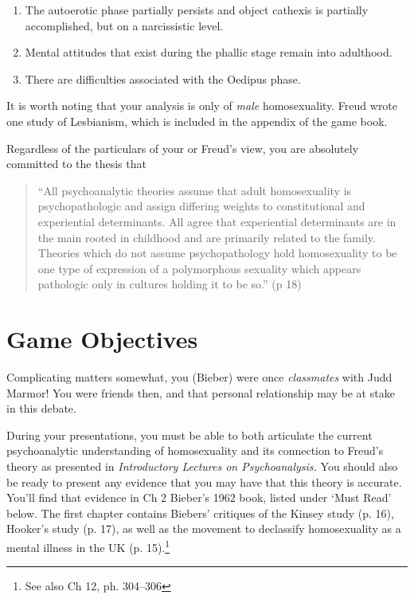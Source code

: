 \begin{refsection}
\begin{enumerate}
\item The autoerotic phase partially persists and object cathexis is partially accomplished, but on a narcissistic level.

\item Mental attitudes that exist during the phallic stage remain into adulthood.

\item There are difficulties associated with the Oedipus phase.

\end{enumerate}

It is worth noting that your analysis is only of \emph{male} homosexuality. Freud wrote one study of Lesbianism, which is included in the appendix of the game book.

Regardless of the particulars of your or Freud's view, you are absolutely committed to the thesis that

\begin{quote}

“All psychoanalytic theories assume that adult homosexuality is psychopathologic and assign differing weights to constitutional and experiential determinants. All agree that experiential determinants are in the main rooted in childhood and are primarily related to the family. Theories which do not assume psychopathology hold homosexuality to be one type of expression of a polymorphous sexuality which appears pathologic only in cultures holding it to be so.” (p 18)
\end{quote}

\section{Game Objectives}
\label{gameobjectives}

Complicating matters somewhat, you (Bieber) were once \emph{classmates} with Judd Marmor! You were friends then, and that personal relationship may be at stake in this debate.

During your presentations, you must be able to both articulate the current psychoanalytic understanding of homosexuality and its connection to Freud's theory as presented in \emph{Introductory Lectures on Psychoanalysis.} You should also be ready to present any evidence that you may have that this theory is accurate. You'll find that evidence in Ch 2 Bieber's 1962 book, listed under `Must Read' below. The first chapter contains Biebers' critiques of the Kinsey study (p. 16), Hooker's study (p. 17), as well as the movement to declassify homosexuality as a mental illness in the UK (p. 15).\footnote{See also Ch 12, ph. 304--306}


\end{refsection}
